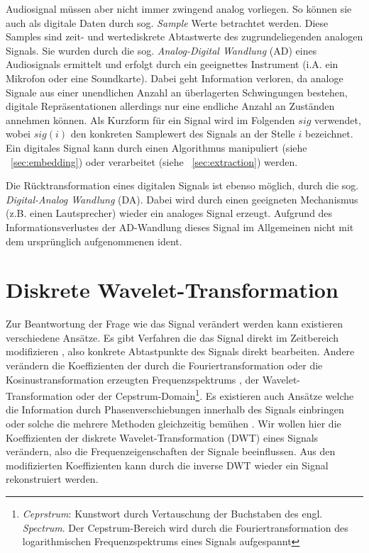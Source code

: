 Audiosignal müssen aber nicht immer zwingend analog vorliegen. So können sie auch als digitale Daten durch sog. \textit{Sample} Werte betrachtet werden. Diese Samples sind zeit- und wertediskrete Abtastwerte des zugrundeliegenden analogen Signals. Sie wurden durch die sog. \textit{Analog-Digital Wandlung} (AD) eines Audiosignals ermittelt und erfolgt durch ein geeignettes Instrument (i.A. ein Mikrofon oder eine Soundkarte). Dabei geht Information verloren, da analoge Signale aus einer unendlichen Anzahl an \"uberlagerten Schwingungen bestehen, digitale Repr\"asentationen allerdings nur eine endliche Anzahl an Zust\"anden annehmen k\"onnen. Als Kurzform für ein Signal wird im Folgenden $sig$ verwendet, wobei $sig(i)$ den konkreten Samplewert des Signals an der Stelle $i$ bezeichnet. Ein digitales Signal kann durch einen Algorithmus manipuliert (siehe ~\ref{sec:embedding}) oder verarbeitet (siehe ~\ref{sec:extraction}) werden.

Die Rücktransformation eines digitalen Signals ist ebenso möglich, durch die sog. \textit{Digital-Analog Wandlung} (DA). Dabei wird durch einen geeigneten Mechanismus (z.B. einen Lautsprecher) wieder ein analoges Signal erzeugt. Aufgrund des Informationsverlustes der AD-Wandlung dieses Signal im Allgemeinen nicht mit dem urspr\"unglich aufgenommenen ident. 


\section{Diskrete Wavelet-Transformation} 
 
	
Zur Beantwortung der Frage wie das Signal ver\"andert werden kann existieren verschiedene Ans\"atze. Es gibt Verfahren die das Signal direkt im Zeitbereich modifizieren \cite{bassia2001robust}\cite{lie2006robust}, also konkrete Abtastpunkte des Signals direkt bearbeiten. Andere ver\"andern die Koeffizienten der durch die Fouriertransformation oder die Kosinustransformation erzeugten Frequenzspektrums \cite{chang2012location}, der Wavelet-Transformation\cite{tang2005digital} oder der Cepstrum-Domain\footnote{\textit{Ceprstrum}: Kunstwort durch Vertauschung der Buchstaben des engl. \textit{Spectrum}. Der Cepstrum-Bereich wird durch die Fouriertransformation des logarithmischen Frequenzspektrums eines Signals aufgespannt}\cite{lee2000digital}\cite{li2000transparent}. Es existieren auch Ans\"atze welche die Information durch Phasenverschiebungen innerhalb des Signals einbringen \cite{dong2004data}\cite{ansari2004data} oder solche die mehrere Methoden gleichzeitig bem\"uhen \cite{chang2012location}\cite{lei2012multipurpose}\cite{tang2005digital}. Wir wollen hier die Koeffizienten der diskrete Wavelet-Transformation (DWT) eines Signals ver\"andern, also die Frequenzeigenschaften der Signale beeinflussen. Aus den modifizierten Koeffizienten kann durch die inverse DWT wieder ein Signal rekonstruiert werden. 
	
